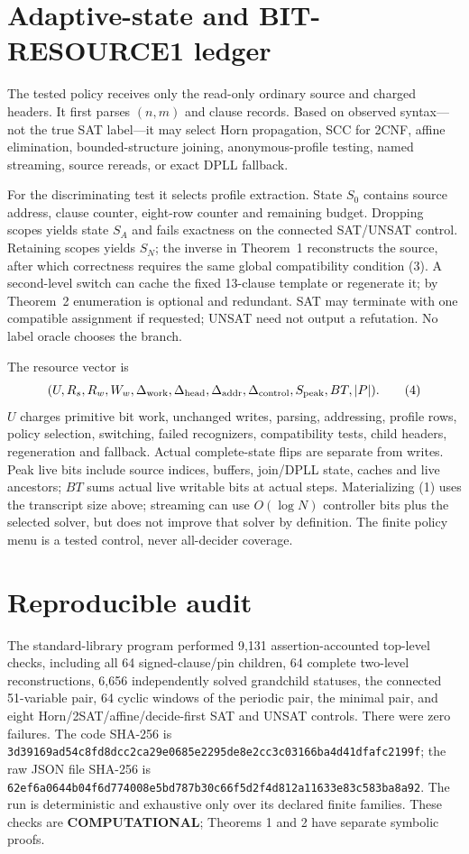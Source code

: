 \documentclass[11pt]{article}
\begin{document}
\section{Adaptive-state and BIT-RESOURCE1 ledger}
The tested policy receives only the read-only ordinary source and charged
headers.  It first parses $(n,m)$ and clause records.  Based on observed
syntax---not the true SAT label---it may select Horn propagation, SCC for
2CNF, affine elimination, bounded-structure joining, anonymous-profile
testing, named streaming, source rereads, or exact DPLL fallback.

For the discriminating test it selects profile extraction.  State $S_0$
contains source address, clause counter, eight-row counter and remaining
budget.  Dropping scopes yields state $S_A$ and fails exactness on the
connected SAT/UNSAT control.  Retaining scopes yields $S_N$; the inverse in
Theorem~1 reconstructs the source, after which correctness requires the
same global compatibility condition (3).  A second-level switch can cache
the fixed 13-clause template or regenerate it; by Theorem~2 enumeration is
optional and redundant.  SAT may terminate with one compatible assignment
if requested; UNSAT need not output a refutation.  No label oracle chooses
the branch.

The resource vector is
\[
(U,R_s,R_w,W_w,\Delta_{\rm work},\Delta_{\rm head},
\Delta_{\rm addr},\Delta_{\rm control},S_{\rm peak},BT,|P|).
\tag{4}
\]
$U$ charges primitive bit work, unchanged writes, parsing, addressing,
profile rows, policy selection, switching, failed recognizers, compatibility
tests, child headers, regeneration and fallback.  Actual complete-state
flips are separate from writes.  Peak live bits include source indices,
buffers, join/DPLL state, caches and live ancestors; $BT$ sums actual live
writable bits at actual steps.  Materializing (1) uses the transcript size
above; streaming can use $O(\log N)$ controller bits plus the selected
solver, but does not improve that solver by definition.  The finite policy
menu is a tested control, never all-decider coverage.

\section{Reproducible audit}
The standard-library program 
performed 9,131 assertion-accounted top-level checks, including all 64
signed-clause/pin children, 64 complete two-level reconstructions, 6,656
independently solved grandchild statuses, the connected 51-variable pair,
64 cyclic windows of the periodic pair, the minimal pair, and eight
Horn/2SAT/affine/decide-first SAT and UNSAT controls.  There were zero
failures.  The code SHA-256 is
\texttt{3d39169ad54c8fd8dcc2ca29e0685e2295de8e2cc3c03166ba4d41dfafc2199f};
the raw JSON file SHA-256 is
\texttt{62ef6a0644b04f6d774008e5bd787b30c66f5d2f4d812a11633e83c583ba8a92}.
The run is deterministic and exhaustive only over its declared finite
families.  These checks are \textbf{COMPUTATIONAL}; Theorems 1 and 2 have
separate symbolic proofs.
\end{document}
